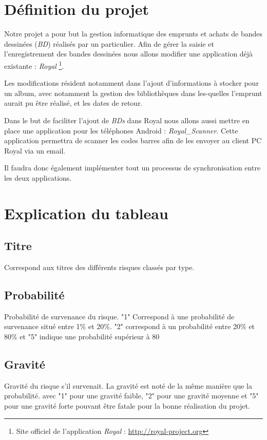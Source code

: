 \documentclass[etudiants]{support-iutrs}
\begin{document}
\header
\section*{Définition du projet}

Notre projet a pour but la gestion informatique des emprunts et achats de bandes dessinées (\emph{BD}) réalisés par un particulier.
Afin de gérer la saisie et l’enregistrement des bandes dessinées nous allons modifier une application déjà existante : \emph{Royal}
\footnote{Site officiel de l'application \emph{Royal} : \url{http://royal-project.org}}.

Les modifications résident notamment dans l'ajout d'informations à stocker pour un album, avec notamment la gestion des bibliothèques dans les-quelles l'emprunt aurait pu être réalisé, et les dates de retour. 

Dans le but de faciliter l'ajout de \emph{BDs} dans Royal nous allons aussi mettre en place une application pour les téléphones Android : \emph{Royal\_Scanner}.
Cette application permettra de scanner les codes barres afin de les envoyer au client PC Royal via un email.

Il faudra donc également implémenter tout un processus de synchronisation entre les deux applications. 

\section*{Explication du tableau}

\subsection{Titre}
Correspond aux titres des différents risques classés par type.

\subsection{Probabilité}
Probabilité de survenance du risque. "1" Correspond à une probabilité de survenance situé entre 1\% et 20\%. "2" correspond à un probabilité entre 20\% et 80\% et "5" indique une probabilité supérieur à 80%

\subsection{Gravité}
Gravité du risque s'il survenait. La gravité est noté de la même manière que la probabilité. avec "1" pour une gravité faible, "2" pour une gravité moyenne et "5" pour une gravité forte pouvant être fatale pour la bonne réalisation du projet.
\end{document}
